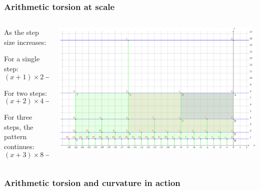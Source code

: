 \documentclass[aspectratio=169]{beamer}
\begin{document}
\begin{frame}
    \frametitle{Arithmetic torsion at scale}
    \begin{columns}
        \begin{column}{0.5\textwidth}
            As the step size increases:

            For a single step:
            \begin{equation}
            (x + 1) \times 2 - (x \times 2 + 1) = 1
            \end{equation}

            For two steps:
            \begin{equation}
            (x + 2) \times 4 - (x \times 4 + 2) = 6
            \end{equation}

            For three steps, the pattern continues:
            \begin{equation}
            (x + 3) \times 8 - (x \times 8 + 3) = 21
            \end{equation}
        \end{column}
        \begin{column}{0.5\textwidth}
            \begin{center}
                \includegraphics[width=1.0\textwidth]{../images/17-area-formula}
            \end{center}
        \end{column}
    \end{columns}
\end{frame}

\begin{frame}
    \frametitle{Arithmetic torsion and curvature in action}
\end{frame}
\end{document}
